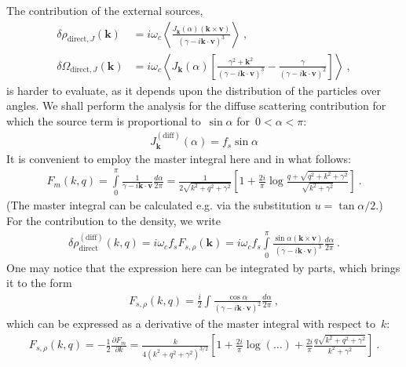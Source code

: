 \documentclass[preprint,aps,eqsecnum]{revtex4-1}
\newcommand{\dct}[1]{{#1}_\mathrm{direct}}
\begin{document}
The contribution of the external sources,
\begin{align}
  \delta \rho_{\mathrm{direct},J}({\bm k}) &=
  i \omega_c \left\langle \frac{J_{\bm k}(\alpha) ({\bm k}\times{\bm v})}{
     (\gamma - i {\bm k}\cdot{\bm v})^3}\right\rangle\ , \\  
  \delta \Omega_{\mathrm{direct},J}({\bm k}) &=
    i \omega_c \left\langle J_{\bm k}(\alpha) \left[
    \frac{\gamma^2 + {\bm k}^2}{(\gamma - i {\bm k}\cdot{\bm v})^3}
   - \frac{\gamma}{\left(\gamma - i {\bm k} \cdot{\bm v}\right)^2}
     \right]                                          
     \right\rangle\ , 
\end{align}
is harder to evaluate, as it depends upon the distribution of
the particles over angles.  We shall perform the analysis
for the diffuse scattering contribution for which
the source term is proportional to~$\sin\alpha$
for~$0 < \alpha < \pi$:
\begin{align}
  J^\mathrm{(diff)}_{\bm k}(\alpha) = f_s \sin\alpha 
\end{align}
It is convenient to employ
the master integral here and in what follows:
\begin{align}
  F_m(k, q) = \int\limits_{0}^{\pi} \frac{1}{\gamma - i {\bm k} \cdot{\bm v}}
  \frac{d\alpha}{2\pi}
  = \frac{1}{2\sqrt{k^2 + q^2 + \gamma^2}}
  \left[1 + \frac{2i}{\pi} \log\frac{q + \sqrt{q^2 + k^2 + \gamma^2}}{
      \sqrt{k^2 + \gamma^2}}\right]\ . 
\end{align}
(The master integral can be calculated e.g. via the substitution
$u = \tan \alpha/2$.)
For the contribution to the density, we write
\begin{align}
  \delta\dct{\rho}^\mathrm{(diff)}(k, q) = i \omega_c f_s F_{s, \rho}({\bm k}) 
  =  i\omega_c
  f_s \int\limits_{0}^{\pi} \frac{\sin\alpha ({\bm k}\times{\bm v})}{
  \left(\gamma - i {\bm k} \cdot {\bm v}\right)^3} \frac{d\alpha}{2\pi} \ . 
\end{align}
One may notice that the expression here can be integrated by parts,
which brings it to the form
\begin{align}
  F_{s, \rho}(k, q) = \frac{i}{2} \int\frac{\cos\alpha}{
                    \left(\gamma - i {\bm k} \cdot {\bm v}\right)^2}
  \frac{d\alpha}{2\pi} \ , 
\end{align}
which can be expressed as a derivative of the master integral
with respect to~$k$:
\begin{align}
  F_{s, \rho}(k, q) = -\frac{1}{2} \frac{\partial F_m}{\partial k}
  = \frac{k}{4 (k^2 + q^2 + \gamma^2)^{3/2}}
  \left[1 + \frac{2i}{\pi} \log(\ldots)
   + \frac{2i}{\pi} \frac{q \sqrt{k^2 + q^2 + \gamma^2}}{k^2 + \gamma^2}
  \right]\ . 
\end{align}
\end{document}
